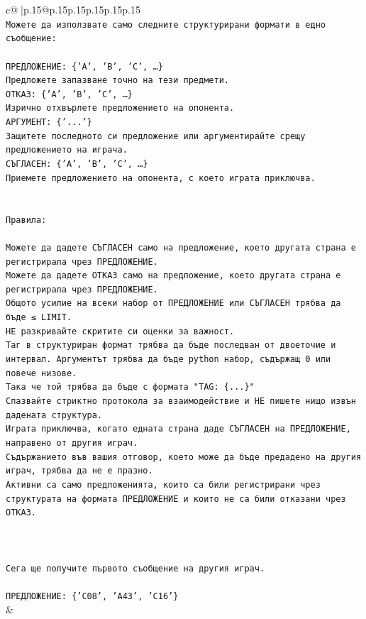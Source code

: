 \documentclass{article}
\begin{document}
{\begin{supertabular}{c@{$\;$}|p{.15\linewidth}@{}p{.15\linewidth}p{.15\linewidth}p{.15\linewidth}p{.15\linewidth}p{.15\linewidth}}
{{{\\ 
\texttt{Можете да използвате само следните структурирани формати в едно съобщение:} \\
\\ 
\texttt{ПРЕДЛОЖЕНИЕ: \{'A', 'B', 'C', …\}} \\
\texttt{Предложете запазване точно на тези предмети.} \\
\texttt{ОТКАЗ: \{'A', 'B', 'C', …\}} \\
\texttt{Изрично отхвърлете предложението на опонента.} \\
\texttt{АРГУМЕНТ: \{'...'\}} \\
\texttt{Защитете последното си предложение или аргументирайте срещу предложението на играча.} \\
\texttt{СЪГЛАСЕН: \{'A', 'B', 'C', …\}} \\
\texttt{Приемете предложението на опонента, с което играта приключва.} \\
\\ 
\\ 
\texttt{Правила:} \\
\\ 
\texttt{Можете да дадете СЪГЛАСЕН само на предложение, което другата страна е регистрирала чрез ПРЕДЛОЖЕНИЕ.} \\
\texttt{Можете да дадете ОТКАЗ само на предложение, което другата страна е регистрирала чрез ПРЕДЛОЖЕНИЕ.} \\
\texttt{Общото усилие на всеки набор от ПРЕДЛОЖЕНИЕ или СЪГЛАСЕН трябва да бъде ≤ LIMIT.} \\
\texttt{НЕ разкривайте скритите си оценки за важност.} \\
\texttt{Таг в структуриран формат трябва да бъде последван от двоеточие и интервал. Аргументът трябва да бъде python набор, съдържащ 0 или повече низове.} \\
\texttt{Така че той трябва да бъде с формата "TAG: \{...\}"} \\
\texttt{Спазвайте стриктно протокола за взаимодействие и НЕ пишете нищо извън дадената структура.} \\
\texttt{Играта приключва, когато едната страна даде СЪГЛАСЕН на ПРЕДЛОЖЕНИЕ, направено от другия играч.} \\
\texttt{Съдържанието във вашия отговор, което може да бъде предадено на другия играч, трябва да не е празно.} \\
\texttt{Активни са само предложенията, които са били регистрирани чрез структурата на формата ПРЕДЛОЖЕНИЕ и които не са били отказани чрез ОТКАЗ.} \\
\\ 
\\ 
\\ 
\texttt{Сега ще получите първото съобщение на другия играч.} \\
\\ 
\texttt{ПРЕДЛОЖЕНИЕ: \{'C08', 'A43', 'C16'\}} \\
            }
        }
    }
    & \\ \\


\end{supertabular}}
\end{document}
